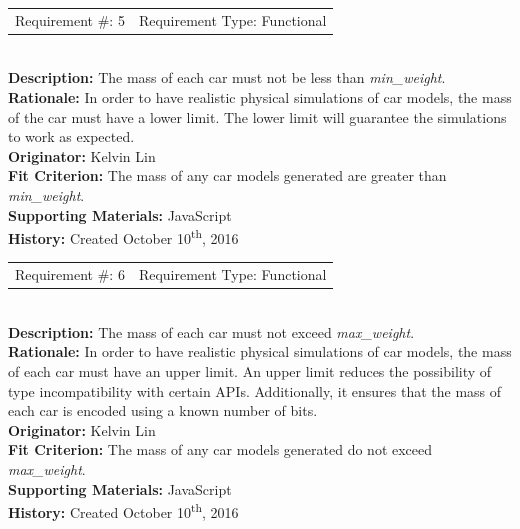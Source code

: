 \documentclass[12pt, titlepage]{article}
\begin{document}
\begin{reqbox}
	\begin{tabular}{cc}
		Requirement \#: 5 & Requirement Type: Functional \\
	\end{tabular} \\
	\textbf{Description:} The mass of each car must not be less than 
	\textit{min\_weight}. \\
	\textbf{Rationale:} In order to have realistic physical simulations of car 
	models, the mass of the car must have a lower limit. The lower limit will 
	guarantee the simulations to work as expected. \\
	\textbf{Originator:} Kelvin Lin\\
	\textbf{Fit Criterion:} The mass of any car models generated are greater than 
	\textit{min\_weight}.\\
	\textbf{Supporting Materials:} JavaScript \\
	\textbf{History:} Created October 10\textsuperscript{th}, 2016
\end{reqbox}

\newpage

\begin{reqbox}
	\begin{tabular}{cc}
		Requirement \#: 6 & Requirement Type: Functional \\
	\end{tabular} \\
	\textbf{Description:} The mass of each car must not exceed 
\textit{max\_weight}. 
	\\
	\textbf{Rationale:} In order to have realistic physical simulations of car 
	models, the mass of each car must have an upper limit. An upper limit reduces 
	the possibility of type incompatibility with certain APIs. Additionally, it 
	ensures that the mass of each car is encoded using a known number of bits.\\
	\textbf{Originator:} Kelvin Lin\\
	\textbf{Fit Criterion:} The mass of any car models generated do not exceed 
	\textit{max\_weight}.\\
	\textbf{Supporting Materials:} JavaScript \\
	\textbf{History:} Created October 10\textsuperscript{th}, 2016
\end{reqbox}
\end{document}

